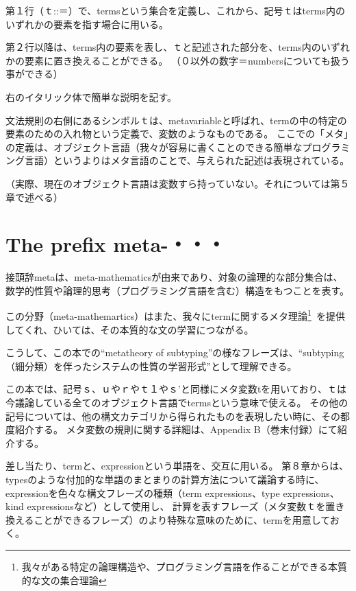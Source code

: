 \documentclass{jsarticle}
\begin{document}
{\vspace*{1zw}
第１行（ｔ::＝）で、termsという集合を定義し、これから、記号ｔはterms内のいずれかの要素を指す場合に用いる。

第２行以降は、terms内の要素を表し、ｔと記述された部分を、terms内のいずれかの要素に置き換えることができる。
（０以外の数字＝numbersについても扱う事ができる）

右のイタリック体で簡単な説明を記す。

\vspace*{1zw}
文法規則の右側にあるシンボルｔは、metavariableと呼ばれ、termの中の特定の要素のための入れ物という定義で、変数のようなものである。
ここでの「メタ」の定義は、オブジェクト言語（我々が容易に書くことのできる簡単なプログラミング言語）というよりはメタ言語のことで、与えられた記述は表現されている。

（実際、現在のオブジェクト言語は変数すら持っていない。それについては第５章で述べる）
\vspace*{1zw}

\newpage
\section{The prefix meta-・・・}

接頭辞metaは、meta-mathematicsが由来であり、対象の論理的な部分集合は、数学的性質や論理的思考（プログラミング言語を含む）構造をもつことを表す。

この分野（meta-mathemartics）はまた、我々にtermに関するメタ理論\footnote{
{\large 我々がある特定の論理構造や、プログラミング言語を作ることができる本質的な文の集合理論}}\
を提供してくれ、ひいては、その本質的な文の学習につながる。

こうして、この本での“metatheory of subtyping”の様なフレーズは、“subtyping（細分類）を伴ったシステムの性質の学習形式”として理解できる。
\vspace*{1zw}

この本では、記号ｓ、ｕやｒやｔ１やｓ’と同様にメタ変数tを用いており、ｔは今議論している全てのオブジェクト言語でtermsという意味で使える。
その他の記号については、他の構文カテゴリから得られたものを表現したい時に、その都度紹介する。
メタ変数の規則に関する詳細は、Appendix B（巻末付録）にて紹介する。


\vspace*{2zw}

差し当たり、termと、expressionという単語を、交互に用いる。
第８章からは、typesのような付加的な単語のまとまりの計算方法について議論する時に、expressionを色々な構文フレーズの種類（term expressions、type expressions、kind expressionsなど）として使用し、
計算を表すフレーズ（メタ変数ｔを置き換えることができるフレーズ）のより特殊な意味のために、termを用意しておく。
\vspace*{1zw}


}
\end{document}
